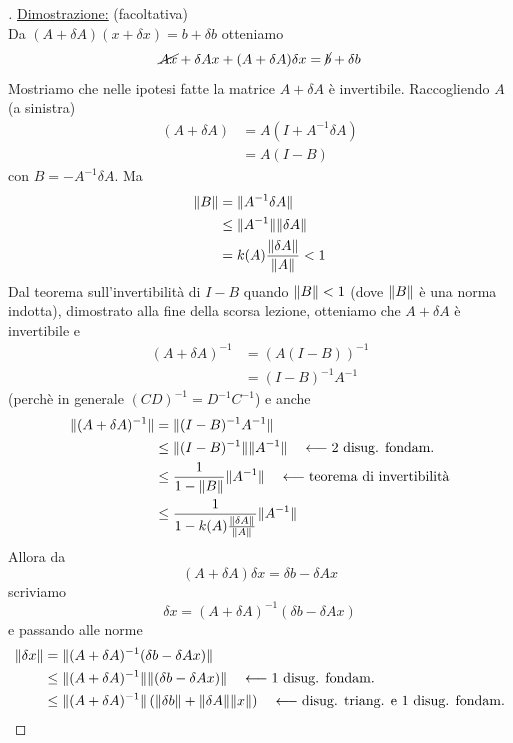 \documentclass[12pt,a4paper]{article}
\DeclarePairedDelimiter{\norma}{\lVert}{\rVert}
\begin{document}
\begin{proof}[\unskip\nopunct]
\uline{Dimostrazione:} (facoltativa)\\
Da $(A + \delta A)(x + \delta x) = b + \delta b$ otteniamo
\[
\cancel{Ax} + \delta A x + (A + \delta A) \delta x = \cancel{b} + \delta b
\]
Mostriamo che nelle ipotesi fatte la matrice $A + \delta A$ è invertibile. Raccogliendo $A$ (a sinistra)
\begin{align*}
    (A + \delta A) & = A(I + A^{-1} \delta A) \\
    & = A(I-B)
\end{align*}
con $B = -A^{-1}\delta A$. Ma
\begin{align*}
    \norma{B} & = \norma{A^{-1} \delta A} \\
    &\le \norma{A^{-1}} \norma{\delta A} \\
    &= k(A)\frac{\norma{\delta A}}{\norma{A}} < 1
\end{align*}
Dal teorema sull'invertibilità di $I-B$ quando $\norma{B}<1$ (dove $\norma{B}$ è una norma indotta), dimostrato alla fine della scorsa lezione, otteniamo che $A + \delta A$ è invertibile e
\begin{align*}
    (A + \delta A)^{-1} &= (A(I - B))^{-1} \\
    &= (I - B)^{-1}A^{-1}
\end{align*}
(perchè in generale $(CD)^{-1} = D^{-1}C^{-1}$) e anche
\begin{align*}
    \norma{(A+\delta A)^{-1}} &= \norma{(I - B)^{-1} A^{-1}} \\
    & \le \norma{(I - B)^{-1}} \norma{A^{-1}} \quad \longleftarrow \text{2 disug. fondam.}\\
    & \le \frac{1}{1 - \norma{B}} \norma{A^{-1}} \quad \longleftarrow \text{teorema di invertibilità} \\
    & \le \frac{1}{1 - k(A) \frac{\norma{\delta A}}{\norma{A}}} \norma{A^{-1}}
\end{align*}
Allora da
\[
(A + \delta A) \delta x = \delta b - \delta A x
\]
scriviamo
\[
\delta x = (A + \delta A)^{-1} (\delta b - \delta A x)
\]
e passando alle norme
\begin{align*}
    \norma{\delta x} &= \norma{(A + \delta A)^{-1} (\delta b - \delta A x)} \\
    & \le \norma{(A + \delta A)^{-1}} \norma{(\delta b - \delta A x)} \quad \longleftarrow \text{1 disug. fondam.}\\
    & \le \norma{(A + \delta A)^{-1}} \left(\norma{\delta b} + \norma{\delta A}\norma{x}\right) \quad \longleftarrow \text{disug. triang. e 1 disug. fondam.}\\

\end{align*}
\end{proof}
\end{document}
